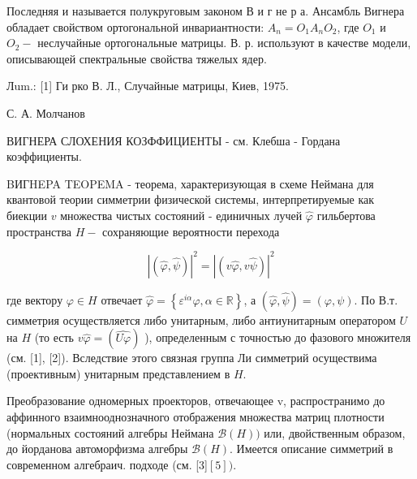 \documentclass[10pt]{article}
\begin{document}
Последняя и называется полукруговым законом В и г не р а. Ансамбль Вигнера обладает свойством ортогональной инвариантности: $A_{n}=O_{1} A_{n} O_{2}$, где $O_{1}$ и $O_{2}-$ неслучайные ортогональные матрицы. В. р. используют в качестве модели, описывающей спектральные свойства тяжелых ядер.



Лum.: [1] Ги рко В. Л., Случайные матрицы, Киев, 1975.



С. А. Молчанов



ВИГНЕРА СЛОХЕНИЯ КОЗФФИЦИЕНТЫ - см. Клебша - Гордана коэффициенты.



BИГHEPA TEOPEMA - теорема, характеризующая в схеме Неймана для квантовой теории симметрии физической системы, интерпретируемые как биекции $v$ множества чистых состояний - единичных лучей $\hat{\varphi}$ гильбертова пространства $H-$ сохраняющие вероятности перехода



\[

|(\hat{\varphi}, \hat{\psi})|^{2}=|(v \hat{\varphi}, v \hat{\psi})|^{2}

\]



где вектору $\varphi \in H$ отвечает $\hat{\varphi}=\left\{\varepsilon^{i \alpha} \varphi, \alpha \in \mathbb{R}\right\}$, а $(\hat{\varphi}, \hat{\psi})=(\varphi, \psi)$. По В.т. симметрия осуществляется либо унитарным, либо антиунитарным оператором $U$ на $H$ (то есть $v \hat{\varphi}=(\widehat{U \varphi})$ ), определенным с точностью до фазового множителя (см. [1], [2]). Вследствие этого связная группа Ли симметрий осуществима (проективным) унитарным представлением в $H$.



Преобразование одномерных проекторов, отвечающее v, распространимо до аффинного взаимнооднозначного отображения множества матриц плотности (нормальных состояний алгебры Неймана $\mathscr{\mathcal { B }}(H))$ или, двойственным образом, до йорданова автоморфизма алгебры $\mathscr{B}(H)$. Имеется описание симметрий в современном алгебраич. подходе (см. [3]$[5])$.
\end{document}

